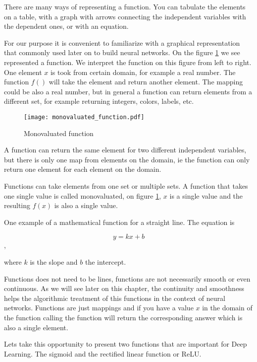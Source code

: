 \documentclass[10pt]{book}
\begin{document}
There are many ways of representing a function.
You can tabulate the elements on a table, with a graph with arrows connecting the independent variables with the dependent ones, or with an equation. 
   
For our purpose it is convenient to familiarize with a graphical representation that commonly used later on to build neural networks.
On the figure \ref{fig:monovaluated} we see represented a function.
We interpret the function on this figure from left to right.
One element $x$ is took from  certain domain, for example a real number. 
The function $f()$ will take the element and return another element.
The mapping could be also a real number, but in general a function can return elements from a different set, for example returning integers, colors, labels, etc.

\begin{center}
\begin{figure}
\texttt{[image: monovaluated\_function.pdf]}
\caption{Monovaluated function}
\label{fig:monovaluated}
\end{figure}
\end{center}

A function can return the same element for two different independent variables, but there is only one map from elements on the domain, ie the function can only return one element for each element on the domain.

Functions can take elements from one set or multiple sets. 
A function that takes one single value is called monovaluated, on figure \ref{fig:monovaluated}, $x$ is a single value and the resulting $f(x)$ is also a single value.

One example of a mathematical function for a straight line.
The equation is

$$y = kx + b$$, 

where $k$ is the slope and $b$ the intercept. 

Functions does not need to be lines, functions are not necessarily smooth or even continuous. As we will see later on this chapter, the continuity and smoothness helps the algorithmic treatment of this functions in the context of neural networks. 
Functions are just mappings and if you have a value $x$ in the domain of the function calling the function will return the corresponding answer which is also a single element.

Lets take this opportunity to present two functions that are important for Deep Learning. The sigmoid and the rectified linear function or ReLU.
\end{document}
